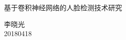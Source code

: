 \documentclass{beamer}
\date{20180418}
\begin{document}
    
    \begin{frame}
        \begin{center}
            \Large{基于卷积神经网络的人脸检测技术研究}
        \end{center}
        \vspace{1cm}
        \hspace{9cm}李晓光\\
        \hspace{9cm}20180418
    \end{frame}
    
    \begin{frame}
    \end{frame}
    
    \begin{frame}
    \end{frame}

    
\end{document}
